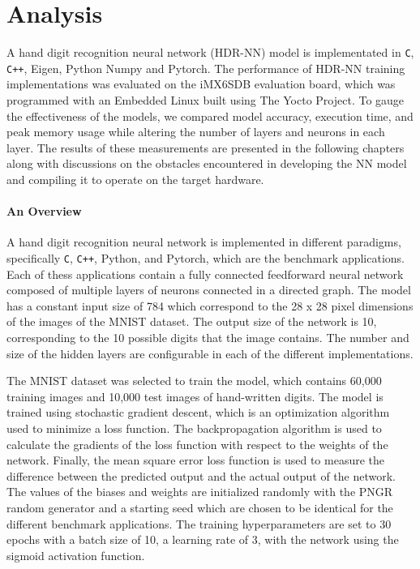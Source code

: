\part{Analysis}

A hand digit recognition neural network (HDR-NN) model is implementated in \texttt{C}, \texttt{C++}, Eigen, Python Numpy and Pytorch. The performance of HDR-NN training implementations was evaluated on the iMX6SDB evaluation board, which was programmed with an Embedded Linux built using The Yocto Project. To gauge the effectiveness of the models, we compared model accuracy, execution time, and peak memory usage while altering the number of layers and neurons in each layer. The results of these measurements are presented in the following chapters along with discussions on the obstacles encountered in developing the NN model and compiling it to operate on the target hardware.

\subsection*{An Overview}

A hand digit recognition neural network is implemented in different paradigms, specifically \texttt{C}, \texttt{C++}, Python, and Pytorch, which are the benchmark applications. Each of thess applications contain a fully connected feedforward neural network composed of multiple layers of neurons connected in a directed graph. The model has a constant input size of 784 which correspond to the 28 x 28 pixel dimensions of the images of the MNIST dataset. The output size of the network is 10, corresponding to the 10 possible digits that the image contains. The number and size of the hidden layers are configurable in each of the different implementations.

The MNIST dataset was selected to train the model, which contains 60,000 training images and 10,000 test images of hand-written digits. The model is trained using stochastic gradient descent, which is an optimization algorithm used to minimize a loss function. The backpropagation algorithm is used to calculate the gradients of the loss function with respect to the weights of the network. Finally, the mean square error loss function is used to measure the difference between the predicted output and the actual output of the network. The values of the biases and weights are initialized randomly with the PNGR random generator and a starting seed which are chosen to be identical for the different benchmark applications. The training hyperparameters are set to 30 epochs with a batch size of 10, a learning rate of 3, with the network using the sigmoid activation function.

